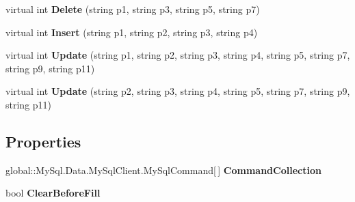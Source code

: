 \begin{DoxyCompactItemize}
\item 
virtual int {\bfseries Delete} (string p1, string p3, string p5, string p7)\hypertarget{class_products_1_1_data_1_1ds_sage_table_adapters_1_1ta_tinte_a3289b1010bbf1eff1774218ea033a64c}{}\label{class_products_1_1_data_1_1ds_sage_table_adapters_1_1ta_tinte_a3289b1010bbf1eff1774218ea033a64c}

\item 
virtual int {\bfseries Insert} (string p1, string p2, string p3, string p4)\hypertarget{class_products_1_1_data_1_1ds_sage_table_adapters_1_1ta_tinte_a311962ad6657c234aa5a1f0a28f5862f}{}\label{class_products_1_1_data_1_1ds_sage_table_adapters_1_1ta_tinte_a311962ad6657c234aa5a1f0a28f5862f}

\item 
virtual int {\bfseries Update} (string p1, string p2, string p3, string p4, string p5, string p7, string p9, string p11)\hypertarget{class_products_1_1_data_1_1ds_sage_table_adapters_1_1ta_tinte_af6239c0494a69feee9337871df327364}{}\label{class_products_1_1_data_1_1ds_sage_table_adapters_1_1ta_tinte_af6239c0494a69feee9337871df327364}

\item 
virtual int {\bfseries Update} (string p2, string p3, string p4, string p5, string p7, string p9, string p11)\hypertarget{class_products_1_1_data_1_1ds_sage_table_adapters_1_1ta_tinte_a845bbb06c45a4f21340251ab0888e1c0}{}\label{class_products_1_1_data_1_1ds_sage_table_adapters_1_1ta_tinte_a845bbb06c45a4f21340251ab0888e1c0}

\end{DoxyCompactItemize}
\subsection*{Properties}
\begin{DoxyCompactItemize}
\item 
global\+::\+My\+Sql.\+Data.\+My\+Sql\+Client.\+My\+Sql\+Command\mbox{[}$\,$\mbox{]} {\bfseries Command\+Collection}\hypertarget{class_products_1_1_data_1_1ds_sage_table_adapters_1_1ta_tinte_ab2ba3bd578feae7297cdb504d337b84a}{}\label{class_products_1_1_data_1_1ds_sage_table_adapters_1_1ta_tinte_ab2ba3bd578feae7297cdb504d337b84a}

\item 
bool {\bfseries Clear\+Before\+Fill}\hypertarget{class_products_1_1_data_1_1ds_sage_table_adapters_1_1ta_tinte_a345cfd4a16984c94f15befff7e1ba3ff}{}\label{class_products_1_1_data_1_1ds_sage_table_adapters_1_1ta_tinte_a345cfd4a16984c94f15befff7e1ba3ff}

\end{DoxyCompactItemize}


